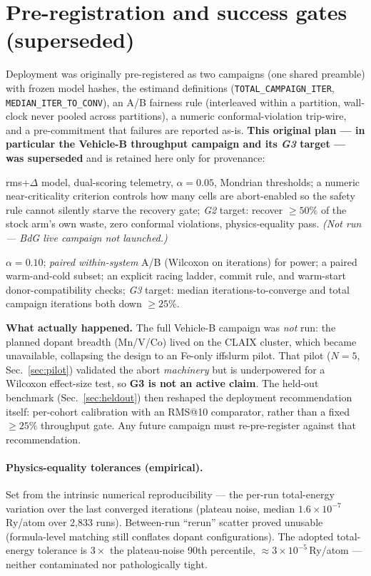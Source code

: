 \documentclass[11pt]{article}
\newcommand{\code}[1]{\texttt{#1}}
\begin{document}
\section{Pre-registration and success gates (superseded)}
\label{sec:prereg}
Deployment was originally pre-registered as two campaigns (one shared preamble) with frozen model hashes,
the estimand definitions (\code{TOTAL\_CAMPAIGN\_ITER}, \code{MEDIAN\_ITER\_TO\_CONV}), an A/B fairness
rule (interleaved within a partition, wall-clock never pooled across partitions), a numeric
conformal-violation trip-wire, and a pre-commitment that failures are reported as-is. \textbf{This original
plan --- in particular the Vehicle-B throughput campaign and its \emph{G3} target --- was superseded} and
is retained here only for provenance:
\begin{description}[leftmargin=1.6em,itemsep=1pt]
  \item[Vehicle A (BdG, conservative).] rms+$\Delta$ model, dual-scoring telemetry, $\alpha=0.05$,
  Mondrian thresholds; a numeric near-criticality criterion controls how many cells are abort-enabled so
  the safety rule cannot silently starve the recovery gate; \emph{G2} target: recover $\ge50\%$ of the
  stock arm's own waste, zero conformal violations, physics-equality pass. \emph{(Not run --- BdG live
  campaign not launched.)}
  \item[Vehicle B (normal, throughput).] $\alpha=0.10$; \emph{paired within-system} A/B (Wilcoxon on
  iterations) for power; a paired warm-and-cold subset; an explicit racing ladder, commit rule, and
  warm-start donor-compatibility checks; \emph{G3} target: median iterations-to-converge and total campaign
  iterations both down $\ge25\%$.
\end{description}
\textbf{What actually happened.} The full Vehicle-B campaign was \emph{not} run: the planned dopant breadth
(Mn/V/Co) lived on the CLAIX cluster, which became unavailable, collapsing the design to an Fe-only iffslurm
pilot. That pilot ($N{=}5$, Sec.~\ref{sec:pilot}) validated the abort \emph{machinery} but is underpowered
for a Wilcoxon effect-size test, so \textbf{G3 is not an active claim}. The held-out benchmark
(Sec.~\ref{sec:heldout}) then reshaped the deployment recommendation itself: per-cohort calibration with an
RMS@10 comparator, rather than a fixed $\ge25\%$ throughput gate. Any future campaign must re-pre-register
against that recommendation.

\paragraph{Physics-equality tolerances (empirical).} Set from the intrinsic numerical reproducibility ---
the per-run total-energy variation over the last converged iterations (plateau noise, median
$1.6\times10^{-7}$\,Ry/atom over 2{,}833 runs). Between-run ``rerun'' scatter proved unusable
(formula-level matching still conflates dopant configurations). The adopted total-energy tolerance is
$3\times$ the plateau-noise 90th percentile, $\approx 3\times10^{-5}$\,Ry/atom --- neither contaminated
nor pathologically tight.
\end{document}
